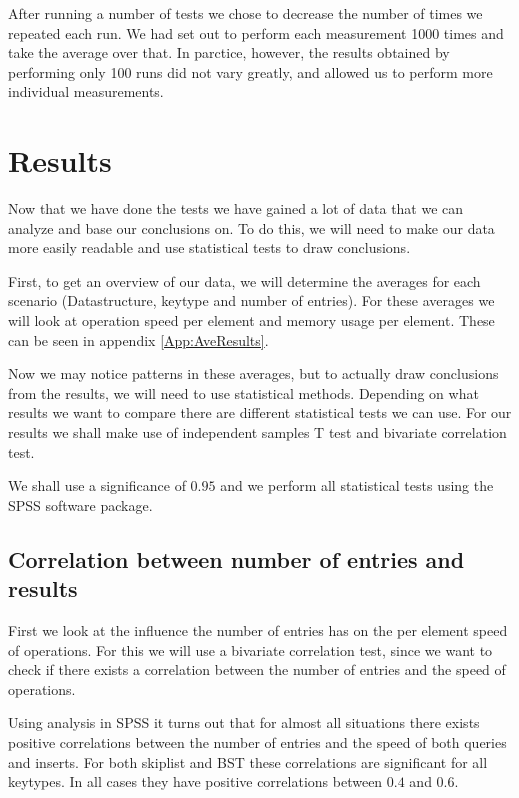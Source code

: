 \documentclass[12pt,a4paper]{article}
\begin{document}
    After running a number of tests we chose to decrease the number of times we repeated each run.
    We had set out to perform each measurement 1000 times and take the average over that.  In
    parctice, however, the results obtained by performing only 100 runs did not vary greatly, and
    allowed us to perform more individual measurements.


    \section{Results}

    Now that we have done the tests we have gained a lot of data that we can analyze and base our 
    conclusions on. To do this, we will need to make our data more easily readable and use statistical
    tests to draw conclusions.

     First, to get an overview of our data, we will determine the averages for each scenario
    (Datastructure, keytype and number of entries). For these averages we will look at operation speed per
    element and memory usage per element. These can be seen in appendix \ref{App:AveResults}.

    Now we may notice patterns in these averages, but to actually draw conclusions from the results, we will
    need to use statistical methods. Depending on what results we want to compare there are different statistical
    tests we can use. For our results we shall make use of independent samples T test and bivariate correlation test.

    We shall use a significance of $0.95$ and we perform all statistical tests using the SPSS software package.

    \subsection{Correlation between number of entries and results}
    First we look at the influence the number of entries has on the per element speed of operations. For this
    we will use a bivariate correlation test, since we want to check if there exists a correlation between 
    the number of entries and the speed of operations.

    Using analysis in SPSS it turns out that for almost all situations there exists positive correlations between the number
    of entries and the speed of both queries and inserts. For both skiplist and BST these correlations are significant for all
    keytypes. In all cases they have positive correlations between $0.4$ and $0.6$. 
\end{document}
